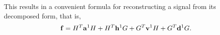 \documentclass[12pt]{article}
\theoremstyle{definition}
\begin{document}
  This results in a convenient formula for reconstructing a signal from its decomposed form, that is,
  \begin{equation}
    \vb{f} =
    H^T \vb{a}^1 H +
    H^T \vb{h}^1 G +
    G^T \vb{v}^1 H +
    G^T \vb{d}^1 G.
  \end{equation}

\end{document}
